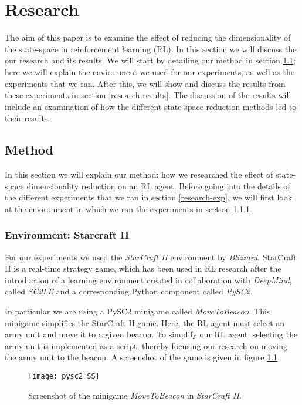 \chapter{Research}\label{research}
The aim of this paper is to examine the effect of reducing the dimensionality of the state-space in reinforcement learning (RL). In this section we will discuss the our research and its results. We will start by detailing our method in section \ref{research-method}; here we will explain the environment we used for our experiments, as well as the experiments that we ran. After this, we will show and discuss the results from these experiments in section \ref{research-results}. The discussion of the results will include an examination of how the different state-space reduction methods led to their results.


\section{Method}\label{research-method}
In this section we will explain our method: how we researched the effect of state-space dimensionality reduction on an RL agent. Before going into the details of the different experiments that we ran in section \ref{research-exp}, we will first look at the environment in which we ran the experiments in section \ref{research-env}.

\subsection{Environment: Starcraft II}\label{research-env}
For our experiments we used the \emph{StarCraft II} environment by \emph{Blizzard}\cite{blizzard}. StarCraft II is a real-time strategy game, which has been used in RL research after the introduction of a learning environment created in collaboration with \emph{DeepMind}, called \emph{SC2LE} and a corresponding Python component called \emph{PySC2}\cite{pysc2}.

In particular we are using a PySC2 minigame called \emph{MoveToBeacon}. This minigame simplifies the StarCraft II game. Here, the RL agent must select an army unit and move it to a given beacon. To simplify our RL agent, selecting the army unit is implemented as a script, thereby focusing our research on moving the army unit to the beacon. A screenshot of the game is given in figure \ref{fig:pysc2_SS}. 

\begin{figure}[h]
    \centering
    \texttt{[image: pysc2\_SS]}
    \caption{Screenshot of the minigame \emph{MoveToBeacon} in \emph{StarCraft II}.}
    \label{fig:pysc2_SS}
\end{figure}

